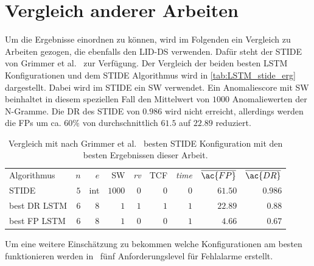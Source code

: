     \fi


\section{Vergleich anderer Arbeiten}\label{sec:erg_vgl}
    Um die Ergebnisse einordnen zu können, wird im Folgenden ein Vergleich zu Arbeiten gezogen, die ebenfalls den \ac{LID-DS} verwenden.
    Dafür steht der \ac{STIDE} von Grimmer et al.~\cite{IDSTHREADGRIMMER2021} zur Verfügung.
    Der Vergleich der beiden besten \ac{LSTM} Konfigurationen und dem \ac{STIDE} Algorithmus wird in \autoref{tab:LSTM_stide_erg} dargestellt.
    Dabei wird im \ac{STIDE} ein \ac{SW} verwendet.
    Ein Anomaliescore mit \ac{SW} beinhaltet in diesem speziellen Fall den Mittelwert von $1000$ Anomaliewerten der N-Gramme. 
    Die \ac{DR} des \ac{STIDE} von $0.986$ wird nicht erreicht, allerdings werden die \acp{FP} um ca. $60\%$ von durchschnittlich $61.5$ auf $22.89$ reduziert.
    
    \begin{table}[ht]
        \centering
        \begin{tabular}{lrrrrrrrr}
            \hline
            \rowcolor{GruvGray!36}
            \multicolumn{9}{c}{Ergebnisse für \ac{LSTM} mit Extraparameter}\\
            \toprule
            Algorithmus & $n$ & $e$ & \ac{SW} & \textit{rv} & \ac{TCF} & \textit{time} & $\overline{\ac{FP}}$ & $\overline{\ac{DR}}$ \\
            \midrule
            \ac{STIDE} & $5$ & int & $1000$ & $0$ & $0$ & $0$ & $61.50$ & $0.986$ \\
            \rowcolor{GruvGray!16}
            best \ac{DR} LSTM & $6$ & 	$8$ & $1$ & 	$1$ & 	$1$ & 	$1$ & 	$22.89$& 	$0.88$ \\
            \rowcolor{GruvGray!16}
            best \ac{FP} LSTM & $6$ & 	$8$ & $1$ &	$0$ & 	$0$ & 	$1$ & 	$4.66$ & 	$0.67$ \\
            \hline
        \end{tabular}
        \caption[Vergeich mit \ac{STIDE}]{Vergleich mit nach Grimmer et al.~\cite{IDSTHREADGRIMMER2021} besten STIDE Konfiguration mit den besten Ergebnissen dieser Arbeit.}
        \label{tab:LSTM_stide_erg}
    \end{table}

    Um eine weitere Einschätzung zu bekommen welche Konfigurationen am besten funktionieren werden in~\cite{IDSTHREADGRIMMER2021} fünf Anforderungslevel für Fehlalarme erstellt.\par\medskip


